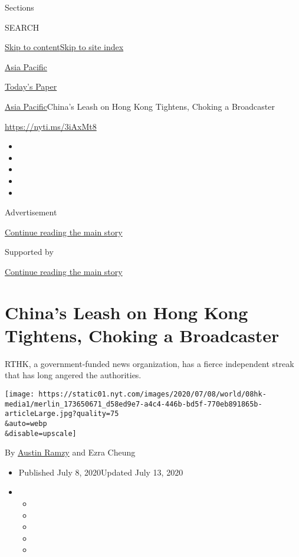 Sections

SEARCH

\protect\hyperlink{site-content}{Skip to
content}\protect\hyperlink{site-index}{Skip to site index}

\href{https://www.nytimes.com/section/world/asia}{Asia Pacific}

\href{https://myaccount.nytimes.com/auth/login?response_type=cookie\&client_id=vi}{}

\href{https://www.nytimes.com/section/todayspaper}{Today's Paper}

\href{/section/world/asia}{Asia Pacific}\textbar{}China's Leash on Hong
Kong Tightens, Choking a Broadcaster

\url{https://nyti.ms/3iAxMt8}

\begin{itemize}
\item
\item
\item
\item
\item
\end{itemize}

Advertisement

\protect\hyperlink{after-top}{Continue reading the main story}

Supported by

\protect\hyperlink{after-sponsor}{Continue reading the main story}

\hypertarget{chinas-leash-on-hong-kong-tightens-choking-a-broadcaster}{%
\section{China's Leash on Hong Kong Tightens, Choking a
Broadcaster}\label{chinas-leash-on-hong-kong-tightens-choking-a-broadcaster}}

RTHK, a government-funded news organization, has a fierce independent
streak that has long angered the authorities.

\texttt{[image: https://static01.nyt.com/images/2020/07/08/world/08hk-media1/merlin\_173650671\_d58ed9e7-a4c4-446b-bd5f-770eb891865b-articleLarge.jpg?quality=75\\\&auto=webp\\\&disable=upscale]}

By \href{https://www.nytimes.com/by/austin-ramzy}{Austin Ramzy} and Ezra
Cheung

\begin{itemize}
\item
  Published July 8, 2020Updated July 13, 2020
\item
  \begin{itemize}
  \item
  \item
  \item
  \item
  \item
  \end{itemize}
\end{itemize}

